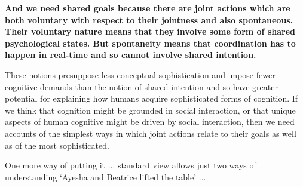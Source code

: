\documentclass[14pt,a4paper]{extarticle}
\begin{document}
\textbf{And we need shared goals because there are joint actions which are both voluntary with respect to their jointness and also spontaneous. 
Their voluntary nature means that they involve some form of shared psychological states.
But spontaneity means that coordination has to happen in real-time and so cannot involve shared intention.}

These notions presuppose less conceptual sophistication and impose fewer cognitive demands than the notion of shared intention and so have greater potential for explaining how humans acquire sophisticated forms of cognition.  If we think that cognition might be grounded in social interaction, or that unique aspects of human cognitive might be driven by social interaction, then we need accounts of the simplest ways in which joint actions relate to their goals as well as of the most sophisticated.

One more way of putting it ... standard view allows just two ways of understanding `Ayesha and Beatrice lifted the table' ...



\end{document}
